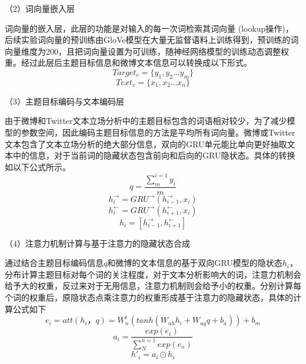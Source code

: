 （2）词向量嵌入层

词向量的嵌入层，此层的功能是对输入的每一次词检索其词向量 (lookup操作)，后续实验词向量的预训练由GloVe模型在大量无监督语料上训练得到，预训练的词向量维度为200，且把词向量设置为可训练，随神经网络模型的训练动态调整权重。经过此层后主题目标信息和微博文本信息可以转换成以下形式。
\begin{equation}\label{target_info} Target_v= \lbrace y_1,y_2...y_m\rbrace \end{equation}
\begin{equation}\label{text_info} Text_v=\lbrace x_1,x_2...x_n\rbrace \end{equation}

（3）主题目标编码与文本编码层

由于微博和Twitter文本立场分析中的主题目标包含的词语相对较少，为了减少模型的参数空间，因此编码主题目标信息的方法是平均所有词向量。微博或Twitter文本包含了文本立场分析的绝大部分信息，双向的GRU单元能比单向更好抽取文本中的信息，对于当前词的隐藏状态包含前向和后向的GRU隐状态。具体的转换如以下公式所示。
\begin{equation}\label{target_info} q=\frac{\sum_{m}^{i=1}y_i}{m} \end{equation}
\begin{equation}\label{target_info} h^→_i = GRU^→(h^→_{i-1}, x_i) \end{equation}
\begin{equation}\label{text_info}  h^←_i = GRU^→(h^←_{i+1}, x_i) \end{equation}
\begin{equation}\label{text_info}  h_i = [h^→_{i-1}, h^←_{i+1}] \end{equation}

（4）注意力机制计算与基于注意力的隐藏状态合成

通过结合主题目标编码信息$q$和微博的文本信息的基于双向GRU模型的隐状态$h_i$，分布计算主题目标对每个词的关注程度，对于文本分析影响大的词，注意力机制会给予大的权重，反过来对于无用信息，注意力机制则会给予小的权重。分别计算每个词的权重后，原隐状态点乘注意力的权重形成基于注意力的隐藏状态，具体的计算公式如下
\begin{equation}\label{conv1} e_i=att(h_i，q)=W^t_n(tanh(W_{ah}h_i+W_{aq}q+b_a))+b_m \end{equation}
\begin{equation}\label{conv1} a_i=\frac{exp(e_i)}{\sum_{N}^{n=1}exp(e_n)} \end{equation}
\begin{equation}\label{conv1} h'_i=a_i \odot h_i \end{equation}

